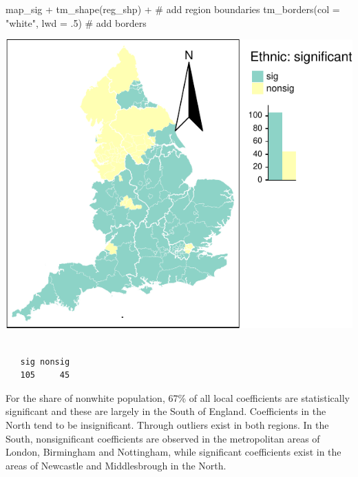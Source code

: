 \documentclass[
  letterpaper,
  DIV=11,
  numbers=noendperiod,
  oneside]{scrreprt}
\newenvironment{Shaded}{\begin{snugshade}}{\end{snugshade}}
\newcommand{\AttributeTok}[1]{\textcolor[rgb]{0.40,0.45,0.13}{#1}}
\newcommand{\CommentTok}[1]{\textcolor[rgb]{0.37,0.37,0.37}{#1}}
\newcommand{\DecValTok}[1]{\textcolor[rgb]{0.68,0.00,0.00}{#1}}
\newcommand{\FunctionTok}[1]{\textcolor[rgb]{0.28,0.35,0.67}{#1}}
\newcommand{\NormalTok}[1]{\textcolor[rgb]{0.00,0.23,0.31}{#1}}
\newcommand{\SpecialCharTok}[1]{\textcolor[rgb]{0.37,0.37,0.37}{#1}}
\newcommand{\StringTok}[1]{\textcolor[rgb]{0.13,0.47,0.30}{#1}}
\begin{document}
\begin{Shaded}
\begin{Highlighting}[]
\NormalTok{map\_sig }\SpecialCharTok{+} \FunctionTok{tm\_shape}\NormalTok{(reg\_shp) }\SpecialCharTok{+} \CommentTok{\# add region boundaries}
  \FunctionTok{tm\_borders}\NormalTok{(}\AttributeTok{col =} \StringTok{"white"}\NormalTok{, }\AttributeTok{lwd =}\NormalTok{ .}\DecValTok{5}\NormalTok{) }\CommentTok{\# add borders}
\end{Highlighting}
\end{Shaded}

\includegraphics{09-gwr_files/figure-pdf/unnamed-chunk-18-1.pdf}

\begin{Shaded}
\end{Shaded}

\begin{verbatim}

   sig nonsig 
   105     45 
\end{verbatim}

For the share of nonwhite population, 67\% of all local coefficients are
statistically significant and these are largely in the South of England.
Coefficients in the North tend to be insignificant. Through outliers
exist in both regions. In the South, nonsignificant coefficients are
observed in the metropolitan areas of London, Birmingham and Nottingham,
while significant coefficients exist in the areas of Newcastle and
Middlesbrough in the North.
\end{document}
